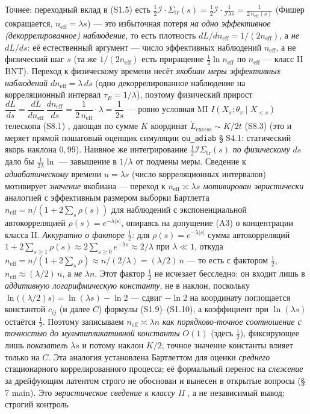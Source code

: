 \documentclass[12pt]{iopart}
\providecommand{\lt}{<}\providecommand{\gt}{>}
\begin{document}
Точнее: переходный вклад в (S1.5) есть \(\tfrac12\mathcal I\cdot\Sigma_{\text{tr}}(s) = \tfrac12\mathcal I\cdot\frac{1}{\mathcal I\lambda s} = \frac{1}{2\,n_{\text{eff}}(s)}\) (Фишер сокращается, \(n_{\text{eff}} = \lambda s\)) --- это избыточная потеря \emph{на одно эффективное (декоррелированное) наблюдение}, то есть плотность \(dL/dn_{\text{eff}} = 1/(2n_{\text{eff}})\), а \emph{не} \(dL/ds\): её естественный аргумент --- число эффективных наблюдений \(n_{\text{eff}}\), а не физический шаг \(s\) (та же \(1/(2n_{\text{eff}})\) есть приращение \(\tfrac12\ln n_{\text{eff}}\) по \(n_{\text{eff}}\) --- класс II BNT). Переход к физическому времени несёт \emph{якобиан меры эффективных наблюдений} \(dn_{\text{eff}} = \lambda\,ds\) (одно декоррелированное наблюдение на корреляционный интервал \(\tau_E = 1/\lambda\)), поэтому физический прирост \(\dfrac{dL}{ds} = \dfrac{dL}{dn_{\text{eff}}}\,\dfrac{dn_{\text{eff}}}{ds} = \dfrac{1}{2\,n_{\text{eff}}}\cdot\lambda = \dfrac{1}{2s}\) --- ровно условная MI \(I(X_s;\theta_v\mid X_{\lt s})\) телескопа (S8.1) \cite{Andriishin2026b}, дающая по сумме \(K\) координат \(\dot L_{\text{excess}}\sim K/2t\) (S8.3) \cite{Andriishin2026b} (это и меряет прямой пошаговый оценщик симуляции \texttt{ou\_adiab} § S4.1: статический якорь наклона \(0{,}99\)). Наивное же интегрирование \(\tfrac12\mathcal I\Sigma_{\text{tr}}(s)\) \emph{по физическому} \(ds\) дало бы \(\tfrac{1}{2\lambda}\ln\) --- завышение в \(1/\lambda\) от подмены меры. Сведение к \emph{адиабатическому} времени \(u = \lambda s\) (число корреляционных интервалов) мотивирует \emph{значение} якобиана --- переход к \(n_{\text{eff}} \asymp \lambda s\) \emph{мотивирован эвристически} аналогией с эффективным размером выборки Бартлетта \(n_{\text{eff}} = n/(1+2\sum_s\rho(s))\) \cite{Bartlett1946} для наблюдений с экспоненциальной автокорреляцией \(\rho(s) = e^{-\lambda|s|}\), опираясь на допущение (A3) о концентрации класса II. \emph{Аккуратно о факторе \(\tfrac12\):} для \(\rho(s) = e^{-\lambda|s|}\) сумма автокорреляций \(1 + 2\sum_{s\ge1}\rho(s) \approx 2\sum_{s\ge0}e^{-\lambda s} \approx 2/\lambda\) при \(\lambda \ll 1\), откуда \(n_{\text{eff}} = n/(1+2\sum_s\rho) \approx n/(2/\lambda) = (\lambda/2)\,n\) --- то есть с фактором \(\tfrac12\), \(n_{\text{eff}} \approx (\lambda/2)\,n\), а \emph{не} \(\lambda n\). Этот фактор \(\tfrac12\) не исчезает бесследно: он входит лишь в \emph{аддитивную логарифмическую константу}, не в наклон, поскольку \(\ln\big((\lambda/2)s\big) = \ln(\lambda s) - \ln 2\) --- сдвиг \(-\ln 2\) на координату поглощается константой \(c_{ij}\) (и далее \(C\)) формулы (S1.9)--(S1.10), а коэффициент при \(\ln(\lambda s)\) остаётся \(\tfrac12\). Поэтому записываем \(n_{\text{eff}} \asymp \lambda n\) \emph{как порядково-точное соотношение с точностью до мультипликативной константы} \(O(1)\) (здесь \(\tfrac12\)), фиксирующее лишь \emph{показатель} \(\lambda s\) и потому наклон \(K/2\); точное значение константы влияет только на \(C\). Эта аналогия установлена Бартлеттом для оценки \emph{среднего} стационарного коррелированного процесса; её формальный перенос на \emph{слежение} за дрейфующим латентом строго не обоснован и вынесен в открытые вопросы (§ 7 main). Это \emph{эвристическое сведение к классу II} \cite{BialekNemenmanTishby2001}, а не независимый вывод; строгий контроль 
\end{document}
